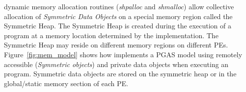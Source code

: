 \openshmem dynamic memory allocation routines (\textit{shpalloc} and \textit{shmalloc}) allow collective allocation of \emph{Symmetric
Data Objects} on a special memory region called the Symmetric Heap. The Symmetric Heap is created during the execution of a program at a memory location
determined by the implementation. The Symmetric Heap may reside on different memory regions on different \ac{PE}s. Figure~\ref{fig:mem_model} shows how \openshmem implements a \ac{PGAS} model using remotely accessible (\emph{Symmetric objects}) and private data objects when executing an \openshmem program. Symmetric data objects are stored on the symmetric heap or 
in the global/static memory section of each \ac{PE}. 

     
